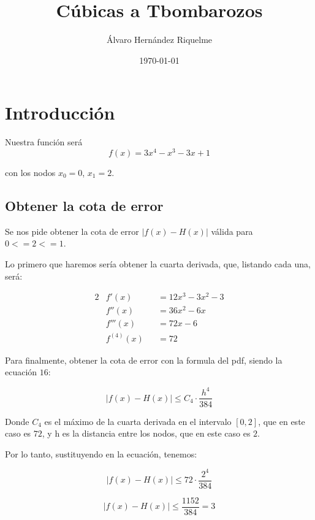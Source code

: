 \documentclass{article}
\title{Cúbicas a Tbombarozos}
\author{Álvaro Hernández Riquelme}
\date{\today}
\begin{document}

\maketitle
\tableofcontents
\newpage

\section{Introducción}

Nuestra función será
\begin{equation}
f(x) = 3x^4 - x^3 - 3x + 1
\end{equation}

con los nodos $x_0 = 0$, $x_1 = 2$.

\subsection{Obtener la cota de error}

Se nos pide obtener la cota de error $|f(x)-H(x)|$ válida para $0<=2<=1$.

Lo primero que haremos sería obtener la cuarta derivada, que, listando cada una, será:

\begin{alignat*}{2}
&f'(x) &&= 12x^3 - 3x^2 - 3 \\
&f''(x) &&= 36x^2 - 6x \\
&f'''(x) &&= 72x - 6 \\
&f^{(4)}(x) &&= 72
\end{alignat*}

Para finalmente, obtener la cota de error con la formula del pdf, siendo la ecuación $16$:

\begin{equation}
|f(x) - H(x)| \leq C_4 \cdot \frac{h^4}{384}
\end{equation}

Donde $C_4$ es el máximo de la cuarta derivada en el intervalo $[0,2]$, que en este caso es $72$, y h es la distancia entre los nodos, que en este caso es $2$.

Por lo tanto, sustituyendo en la ecuación, tenemos:

\begin{equation}
|f(x) - H(x)| \leq 72 \cdot \frac{2^4}{384}
\end{equation}

\begin{equation}
|f(x) - H(x)| \leq \frac{1152}{384} = 3
\end{equation}
\end{document}
